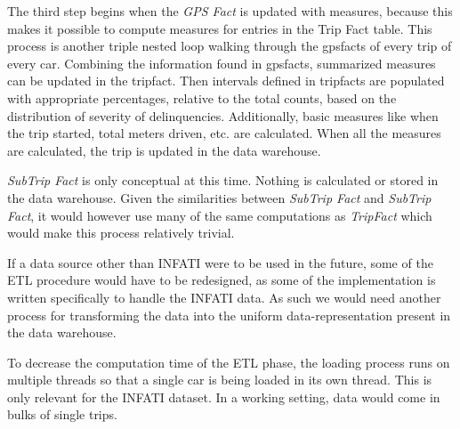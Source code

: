 The third step begins when the \textit{GPS Fact} is updated with measures, because this makes it possible to compute measures for entries in the Trip Fact table. This process is another triple nested loop walking through the gpsfacts of every trip of every car. Combining the information found in gpsfacts, summarized measures can be updated in the tripfact. Then intervals defined in tripfacts are populated with appropriate percentages, relative to the total counts, based on the distribution of severity of delinquencies. Additionally, basic measures like when the trip started, total meters driven, etc. are calculated. When all the measures are calculated, the trip is updated in the data warehouse.

\textit{SubTrip Fact} is only conceptual at this time. Nothing is calculated or stored in the data warehouse. Given the similarities between \textit{SubTrip Fact} and \textit{SubTrip Fact}, it would however use many of the same computations as \textit{TripFact} which would make this process relatively trivial.

If a data source other than INFATI were to be used in the future, some of the ETL procedure would have to be redesigned, as some of the implementation is written specifically to handle the INFATI data. As such we would need another process for transforming the data into the uniform data-representation present in the data warehouse.

To decrease the computation time of the ETL phase, the loading process runs on multiple threads so that a single car is being loaded in its own thread. This is only relevant for the INFATI dataset. In a working setting, data would come in bulks of single trips. 